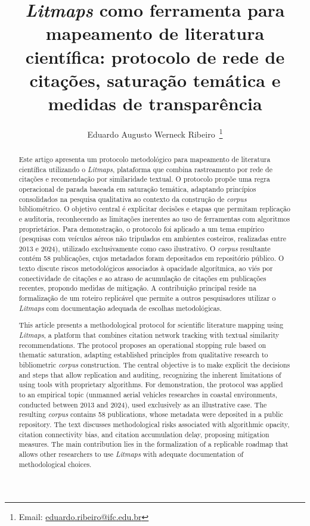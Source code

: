 \documentclass[portuguese]{textolivre}
\title{\textit{Litmaps} como ferramenta para mapeamento de literatura científica: protocolo de rede de citações, saturação temática e medidas de transparência}
\author[1]{Eduardo Augusto Werneck Ribeiro~\orcid{0000-0003-3313-6783}\thanks{Email: \href{mailto:eduardo.ribeiro@ifc.edu.br}{eduardo.ribeiro@ifc.edu.br}}}
\affil[1]{Instituto Federal Catarinense, São Francisco do Sul, SC, Brasil.}
\begin{document}
\maketitle

\begin{polyabstract}
\begin{abstract}
Este artigo apresenta um protocolo metodológico para mapeamento de literatura científica utilizando o \textit{Litmaps}, plataforma que combina rastreamento por rede de citações e recomendação por similaridade textual. O protocolo propõe uma regra operacional de parada baseada em saturação temática, adaptando princípios consolidados na pesquisa qualitativa ao contexto da construção de \textit{corpus} bibliométrico. O objetivo central é explicitar decisões e etapas que permitam replicação e auditoria, reconhecendo as limitações inerentes ao uso de ferramentas com algoritmos proprietários. Para demonstração, o protocolo foi aplicado a um tema empírico (pesquisas com veículos aéreos não tripulados em ambientes costeiros, realizadas entre 2013 e 2024), utilizado exclusivamente como caso ilustrativo. O \textit{corpus} resultante contém 58 publicações, cujos metadados foram depositados em repositório público. O texto discute riscos metodológicos associados à opacidade algorítmica, ao viés por conectividade de citações e ao atraso de acumulação de citações em publicações recentes, propondo medidas de mitigação. A contribuição principal reside na formalização de um roteiro replicável que permite a outros pesquisadores utilizar o \textit{Litmaps} com documentação adequada de escolhas metodológicas.

\end{abstract}

\begin{english}
\begin{abstract}
This article presents a methodological protocol for scientific literature mapping using \textit{Litmaps}, a platform that combines citation network tracking with textual similarity recommendations. The protocol proposes an operational stopping rule based on thematic saturation, adapting established principles from qualitative research to bibliometric \textit{corpus} construction. The central objective is to make explicit the decisions and steps that allow replication and auditing, recognizing the inherent limitations of using tools with proprietary algorithms. For demonstration, the protocol was applied to an empirical topic (unmanned aerial vehicles researches in coastal environments, conducted between 2013 and 2024), used exclusively as an illustrative case. The resulting \textit{corpus} contains 58 publications, whose metadata were deposited in a public repository. The text discusses methodological risks associated with algorithmic opacity, citation connectivity bias, and citation accumulation delay, proposing mitigation measures. The main contribution lies in the formalization of a replicable roadmap that allows other researchers to use \textit{Litmaps} with adequate documentation of methodological choices.


\end{abstract}
\end{english}
\end{polyabstract}
\end{document}
